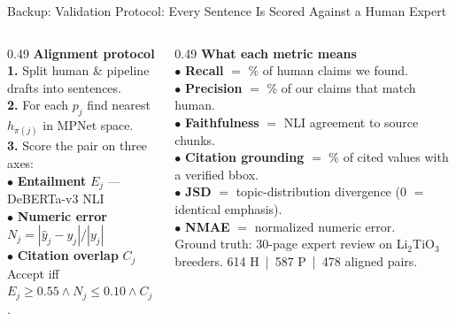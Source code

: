 \documentclass[aspectratio=169, 11pt]{beamer}
\begin{document}
\begin{frame}{Backup: Validation Protocol: Every Sentence Is Scored Against a Human Expert}
\begin{columns}[T]
  \begin{column}{0.49\textwidth}
    \textbf{\color{ornlgreen}Alignment protocol}\\[2pt]
    {\footnotesize
    \textbf{1.} Split human \& pipeline drafts into sentences.\\
    \textbf{2.} For each $p_j$ find nearest $h_{\pi(j)}$ in MPNet space.\\
    \textbf{3.} Score the pair on three axes:
    }\\[4pt]
    {\footnotesize
    \;$\bullet$ \textbf{Entailment} $E_j$ — DeBERTa-v3 NLI\\
    \;$\bullet$ \textbf{Numeric error} $N_j{=}|\hat y_j{-}y_j|/|y_j|$\\
    \;$\bullet$ \textbf{Citation overlap} $C_j$
    }\\[4pt]
    {\footnotesize Accept iff $E_j{\geq}0.55 \wedge N_j{\leq}0.10
     \wedge C_j{\geq}0.5$.}
  \end{column}
  \begin{column}{0.49\textwidth}
    \textbf{\color{backgroundgreen}What each metric means}\\[2pt]
    {\footnotesize
    \;$\bullet$ \textbf{Recall} $=$ \% of human claims we found.\\
    \;$\bullet$ \textbf{Precision} $=$ \% of our claims that match human.\\
    \;$\bullet$ \textbf{Faithfulness} $=$ NLI agreement to source chunks.\\
    \;$\bullet$ \textbf{Citation grounding} $=$ \% of cited values
     with a verified bbox.\\
    \;$\bullet$ \textbf{JSD} $=$ topic-distribution divergence
     (0 $=$ identical emphasis).\\
    \;$\bullet$ \textbf{NMAE} $=$ normalized numeric error.}\\[4pt]
    {\scriptsize\color{ornlgrey}
    Ground truth: 30-page expert review on Li$_2$TiO$_3$ breeders.
    614 H \,|\, 587 P \,|\, 478 aligned pairs.}
  \end{column}
\end{columns}
\end{frame}
\end{document}
